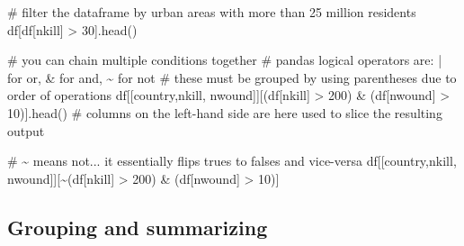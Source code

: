 \documentclass[
  letterpaper,
  DIV=11,
  numbers=noendperiod]{scrreprt}
\newenvironment{Shaded}{\begin{snugshade}}{\end{snugshade}}
\newcommand{\CommentTok}[1]{\textcolor[rgb]{0.37,0.37,0.37}{#1}}
\newcommand{\DecValTok}[1]{\textcolor[rgb]{0.68,0.00,0.00}{#1}}
\newcommand{\NormalTok}[1]{\textcolor[rgb]{0.00,0.23,0.31}{#1}}
\newcommand{\OperatorTok}[1]{\textcolor[rgb]{0.37,0.37,0.37}{#1}}
\newcommand{\StringTok}[1]{\textcolor[rgb]{0.13,0.47,0.30}{#1}}
\begin{document}
\begin{Shaded}
\begin{Highlighting}[]
\CommentTok{\# filter the dataframe by urban areas with more than 25 million residents}
\NormalTok{df[df[}\StringTok{\textquotesingle{}nkill\textquotesingle{}}\NormalTok{] }\OperatorTok{\textgreater{}} \DecValTok{30}\NormalTok{].head()}
\end{Highlighting}
\end{Shaded}

\begin{Shaded}
\begin{Highlighting}[]
\CommentTok{\# you can chain multiple conditions together}
\CommentTok{\# pandas logical operators are: | for or, \& for and, \textasciitilde{} for not}
\CommentTok{\# these must be grouped by using parentheses due to order of operations}
\NormalTok{df[[}\StringTok{\textquotesingle{}country\textquotesingle{}}\NormalTok{,}\StringTok{\textquotesingle{}nkill\textquotesingle{}}\NormalTok{, }\StringTok{\textquotesingle{}nwound\textquotesingle{}}\NormalTok{]][(df[}\StringTok{\textquotesingle{}nkill\textquotesingle{}}\NormalTok{] }\OperatorTok{\textgreater{}} \DecValTok{200}\NormalTok{) }\OperatorTok{\&}\NormalTok{ (df[}\StringTok{\textquotesingle{}nwound\textquotesingle{}}\NormalTok{] }\OperatorTok{\textgreater{}} \DecValTok{10}\NormalTok{)].head()}
\CommentTok{\# columns on the left{-}hand side are here used to slice the resulting output}
\end{Highlighting}
\end{Shaded}

\begin{Shaded}
\begin{Highlighting}[]
\CommentTok{\# \textasciitilde{} means not... it essentially flips trues to falses and vice{-}versa}
\NormalTok{df[[}\StringTok{\textquotesingle{}country\textquotesingle{}}\NormalTok{,}\StringTok{\textquotesingle{}nkill\textquotesingle{}}\NormalTok{, }\StringTok{\textquotesingle{}nwound\textquotesingle{}}\NormalTok{]][}\OperatorTok{\textasciitilde{}}\NormalTok{(df[}\StringTok{\textquotesingle{}nkill\textquotesingle{}}\NormalTok{] }\OperatorTok{\textgreater{}} \DecValTok{200}\NormalTok{) }\OperatorTok{\&}\NormalTok{ (df[}\StringTok{\textquotesingle{}nwound\textquotesingle{}}\NormalTok{] }\OperatorTok{\textgreater{}} \DecValTok{10}\NormalTok{)]}
\end{Highlighting}
\end{Shaded}

\subsection{Grouping and summarizing}\label{grouping-and-summarizing}
\end{document}
